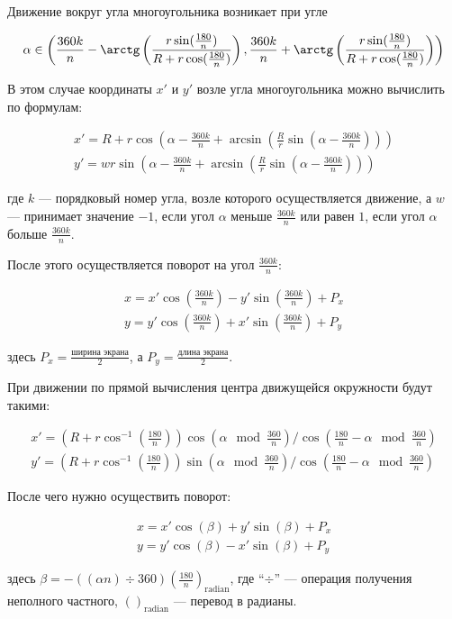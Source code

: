 Движение вокруг угла многоугольника возникает при угле

$$\alpha \in \left (\frac {360k} {n} - \arctg \left (\frac {r \sin(\frac {180} {n})} {R+r \cos(\frac {180} {n})} \right ),
\frac {360k} {n} +\arctg \left (\frac {r \sin(\frac {180} {n})} {R+r \cos(\frac {180} {n})} \right )\right )$$

В этом случае координаты $x'$ и $y'$ возле угла многоугольника можно вычислить по формулам:

\begin{gather*}
x' = R + r \cos\left(\alpha - \frac {360 k} {n} + \arcsin\left(\frac {R} {r} \sin \left(\alpha - \frac {360k} {n}\right)\right) \right) \\
y' = wr \sin \left(\alpha - \frac {360k} {n} + \arcsin \left(\frac {R} {r} \sin \left(\alpha - \frac {360k} {n}\right) \right) \right)
\end{gather*}

где $k$ --- порядковый номер угла, возле которого осуществляется движение, а $w$ --- принимает значение $-1$, если угол $\alpha$ меньше $\frac {360k} {n}$ или равен $1$, если угол $\alpha$ больше $\frac {360k} {n}$.

После этого осуществляется поворот на угол $\frac {360k} {n}$:

\begin{gather*}
x = x' \cos (\frac {360k} {n}) - y' \sin (\frac {360k} {n}) + P_x \\
y = y' \cos (\frac {360k} {n}) + x' \sin (\frac {360k} {n}) + P_y
\end{gather*}

здесь $P_x = \frac {\text{ширина экрана}} {2}$, а $P_y = \frac {\text{длина экрана}} {2}$.

При движении по прямой вычисления центра движущейся окружности будут такими:

\begin{gather*}
x' = \left(R + r \cos^{-1}\left(\frac {180} {n}\right) \right) \cos \left(\alpha \mod \frac {360} {n}\right) / \cos \left(\frac {180} {n} - \alpha \mod \frac {360} {n}\right) \\
y' = \left(R + r \cos^{-1}\left(\frac {180} {n}\right) \right) \sin \left(\alpha \mod \frac {360} {n}\right) / \cos \left(\frac {180} {n} - \alpha \mod \frac {360} {n}\right)
\end{gather*}

После чего нужно осуществить поворот:

\begin{gather*}
x = x' \cos(\beta) + y' \sin (\beta) + P_x \\
y = y' \cos (\beta) - x' \sin (\beta) + P_y
\end{gather*}

здесь $\beta = - ((\alpha n) \div 360) (\frac {180} {n})_{\text{radian}}$, где ``$\div$'' --- операция получения неполного частного, $()_{\text{radian}}$ --- перевод в радианы.
